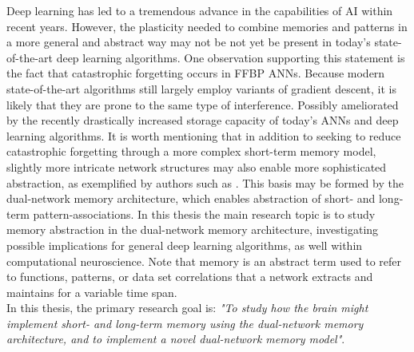 Deep learning has led to a tremendous advance in the capabilities of AI within recent years. However, the plasticity needed to combine memories and patterns in a more general and abstract way may not be not yet be present in today's state-of-the-art deep learning algorithms. One observation supporting this statement is the fact that catastrophic forgetting occurs in FFBP ANNs. Because modern state-of-the-art algorithms still largely employ variants of gradient descent, it is likely that they are prone to the same type of interference. Possibly ameliorated by the recently drastically increased storage capacity of today's ANNs and deep learning algorithms.
It is worth mentioning that in addition to seeking to reduce catastrophic forgetting through a more complex short-term memory model, slightly more intricate network structures may also enable more sophisticated abstraction, as exemplified by authors such as \cite{Tani2014}. This basis may be formed by the dual-network memory architecture, which enables abstraction of short- and long-term pattern-associations.
In this thesis the main research topic is to study memory abstraction in the dual-network memory architecture, investigating possible implications for general deep learning algorithms, as well within computational neuroscience. Note that memory is an abstract term used to refer to functions, patterns, or data set correlations that a network extracts and maintains for a variable time span.
\\
In this thesis, 
the primary research goal is: \textit{"To study how the brain might implement short- and long-term memory using the dual-network memory architecture, and to implement a novel dual-network memory model"}.

